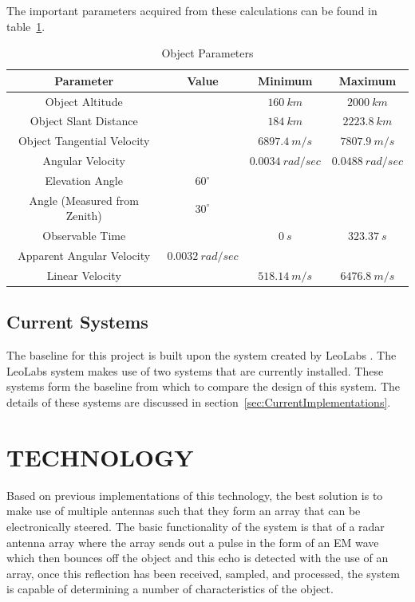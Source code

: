 \documentclass[11pt]{witseiepaper}
\begin{document}
\begin{bibunit}[witseie]
The important parameters acquired from these calculations can be found in table~\ref{tab:ImportantObjectParameters}.

\begin{table}
    \caption{Object Parameters}
    \label{tab:ImportantObjectParameters}
    \begin{center}
        \begin{tabular}{c c c c}
            \hline 
            Parameter & Value & Minimum & Maximum \\
            \hline
            Object Altitude & & $160~km$ & $2000~km$ \\
            Object Slant Distance & & $184~km$ & $2223.8~km$ \\
            Object Tangential Velocity & & $6897.4~m/s$ & $7807.9~m/s$ \\
            Angular Velocity & & $0.0034~rad/sec$ & $0.0488~rad/sec$ \\
            Elevation Angle & $60^{\circ}$ & &  \\
            Angle (Measured from Zenith) & $30^{\circ}$ & &  \\
            Observable Time & & $0~s$ & $323.37~s$ \\
            Apparent Angular Velocity & $0.0032~rad/sec$ & & \\
            Linear Velocity & &  $518.14~m/s$ & $6476.8~m/s$ \\
        \end{tabular}
    \end{center}
\end{table}

\subsection{Current Systems} \label{sec:CurrentSystems}
The baseline for this project is built upon the system created by LeoLabs \cite{LEOLABS}. The LeoLabs system makes use of two systems that are currently installed. These systems form the baseline from which to compare the design of this system. The details of these systems are discussed in section~\ref{sec:CurrentImplementations}.


\section{TECHNOLOGY} \label{sec:TECHNOLOGY}
Based on previous implementations of this technology, the best solution is to make use of multiple antennas such that they form an array that can be electronically steered.
The basic functionality of the system is that of a radar antenna array where the array sends out a pulse in the form of an EM wave which then bounces off the object and this echo is detected with the use of an array, once this reflection has been received, sampled, and processed, the system is capable of determining a number of characteristics of the object.


\end{bibunit}
\end{document}
